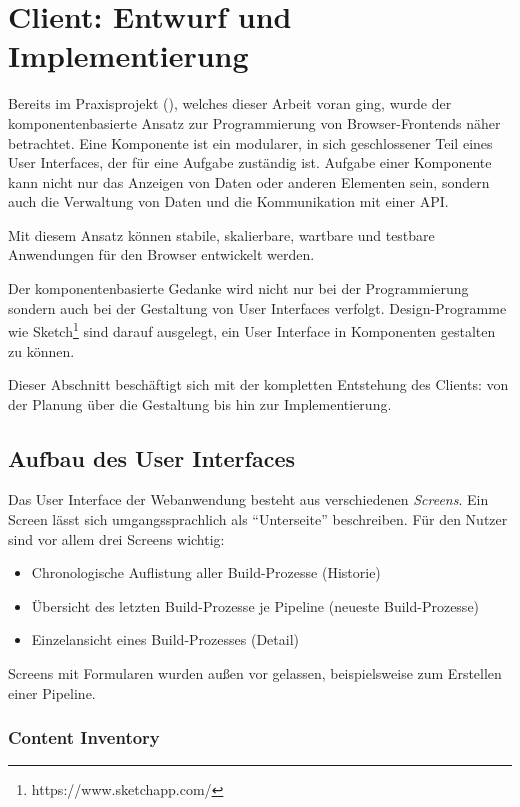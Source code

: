 \section{Client: Entwurf und Implementierung}

Bereits im Praxisprojekt (\cite{Maemecke2017}), welches dieser Arbeit voran ging, wurde der komponentenbasierte Ansatz zur Programmierung von Browser-Frontends näher betrachtet. Eine Komponente ist ein modularer, in sich geschlossener Teil eines User Interfaces, der für eine Aufgabe zuständig ist. Aufgabe einer Komponente kann nicht nur das Anzeigen von Daten oder anderen Elementen sein, sondern auch die Verwaltung von Daten und die Kommunikation mit einer API.

Mit diesem Ansatz können stabile, skalierbare, wartbare und testbare Anwendungen für den Browser entwickelt werden.

Der komponentenbasierte Gedanke wird nicht nur bei der Programmierung sondern auch bei der Gestaltung von User Interfaces verfolgt. Design-Programme wie Sketch\footnote{https://www.sketchapp.com/} sind darauf ausgelegt, ein User Interface in Komponenten gestalten zu können.

Dieser Abschnitt beschäftigt sich mit der kompletten Entstehung des Clients: von der Planung über die Gestaltung bis hin zur Implementierung.

\subsection{Aufbau des User Interfaces}
\label{subsec:entwurf-user-interface}

Das User Interface der Webanwendung besteht aus verschiedenen \emph{Screens}. Ein Screen lässt sich umgangssprachlich als ``Unterseite'' beschreiben. Für den Nutzer sind vor allem drei Screens wichtig:

\begin{itemize}
  \item Chronologische Auflistung aller Build-Prozesse (Historie)
  \item Übersicht des letzten Build-Prozesse je Pipeline (neueste Build-Prozesse)
  \item Einzelansicht eines Build-Prozesses (Detail)
\end{itemize}

Screens mit Formularen wurden außen vor gelassen, beispielsweise zum Erstellen einer Pipeline.

\subsubsection{Content Inventory}

